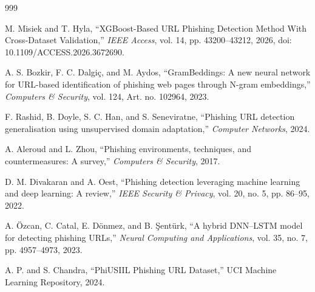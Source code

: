 \begin{thebibliography}{999}

M. Misiek and T. Hyla, ``XGBoost-Based URL Phishing Detection Method With Cross-Dataset Validation,'' \textit{IEEE Access}, vol. 14, pp. 43200--43212, 2026, doi: 10.1109/ACCESS.2026.3672690.

A. S. Bozkir, F. C. Dalgi\c{c}, and M. Aydos, ``GramBeddings: A new neural network for URL-based identification of phishing web pages through N-gram embeddings,'' \textit{Computers \& Security}, vol. 124, Art. no. 102964, 2023.

F. Rashid, B. Doyle, S. C. Han, and S. Seneviratne, ``Phishing URL detection generalisation using unsupervised domain adaptation,'' \textit{Computer Networks}, 2024.

A. Aleroud and L. Zhou, ``Phishing environments, techniques, and countermeasures: A survey,'' \textit{Computers \& Security}, 2017.

D. M. Divakaran and A. Oest, ``Phishing detection leveraging machine learning and deep learning: A review,'' \textit{IEEE Security \& Privacy}, vol. 20, no. 5, pp. 86--95, 2022.

A. Özcan, C. Catal, E. Dönmez, and B. \c{S}entürk, ``A hybrid DNN--LSTM model for detecting phishing URLs,'' \textit{Neural Computing and Applications}, vol. 35, no. 7, pp. 4957--4973, 2023.

A. P. and S. Chandra, ``PhiUSIIL Phishing URL Dataset,'' UCI Machine Learning Repository, 2024.
\end{thebibliography}
